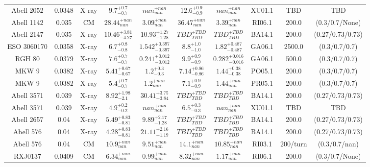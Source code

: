 \begin{table}
\begin{tabular}{cccccccccc}
Abell 2052 & 0.0348 & X-ray & ${9.7}^{+0.7}_{-0.7}$ & ${nan}^{+nan}_{nan}$ & ${12.6}^{+0.9}_{-0.9}$ & ${nan}^{+nan}_{nan}$ & XU01.1 & TBD & TBD \\
Abell 1142 & 0.035 & CM & ${28.44}^{+nan}_{nan}$ & ${3.09}^{+nan}_{nan}$ & ${36.47}^{+nan}_{nan}$ & ${3.39}^{+nan}_{nan}$ & RI06.1 & 200.0 & (0.3/0.7/None) \\
Abell 2147 & 0.035 & X-ray & ${10.46}^{+3.81}_{-4.27}$ & ${10.93}^{+1.27}_{-1.28}$ & ${TBD}^{+TBD}_{TBD}$ & ${TBD}^{+TBD}_{TBD}$ & BA14.1 & 200.0 & (0.27/0.73/0.73) \\
ESO 3060170 & 0.0358 & X-ray & ${6.7}^{+0.8}_{-0.8}$ & ${1.542}^{+0.397}_{-0.397}$ & ${8.8}^{+1.0}_{-1.0}$ & ${1.82}^{+0.487}_{-0.487}$ & GA06.1 & 2500.0 & (0.3/0.7/0.7) \\
RGH 80 & 0.0379 & X-ray & ${7.6}^{+0.7}_{-0.7}$ & ${0.241}^{+0.012}_{-0.012}$ & ${9.9}^{+0.9}_{-0.9}$ & ${0.282}^{+0.016}_{-0.016}$ & GA06.1 & 500.0 & (0.3/0.7/0.7) \\
MKW 9 & 0.0382 & X-ray & ${5.41}^{+0.67}_{-0.67}$ & ${1.2}^{+0.3}_{-0.3}$ & ${7.14}^{+0.86}_{-0.86}$ & ${1.44}^{+0.38}_{-0.38}$ & PO05.1 & 200.0 & (0.3/0.7/0.7) \\
MKW 9 & 0.0382 & X-ray & ${5.4}^{+0.7}_{-0.7}$ & ${1.2}^{+nan}_{nan}$ & ${7.1}^{+0.9}_{-0.9}$ & ${1.44}^{+nan}_{nan}$ & PR05.1 & 200.0 & (0.3/0.7/0.7) \\
Abell 3571 & 0.039 & X-ray & ${8.92}^{+1.98}_{-2.1}$ & ${30.41}^{+3.75}_{-3.84}$ & ${TBD}^{+TBD}_{TBD}$ & ${TBD}^{+TBD}_{TBD}$ & BA14.1 & 200.0 & (0.27/0.73/0.73) \\
Abell 3571 & 0.039 & X-ray & ${4.9}^{+0.2}_{-0.2}$ & ${nan}^{+nan}_{nan}$ & ${6.5}^{+0.3}_{-0.3}$ & ${nan}^{+nan}_{nan}$ & XU01.1 & TBD & TBD \\
Abell 2657 & 0.04 & X-ray & ${5.49}^{+0.83}_{-0.81}$ & ${9.89}^{+2.17}_{-1.28}$ & ${TBD}^{+TBD}_{TBD}$ & ${TBD}^{+TBD}_{TBD}$ & BA14.1 & 200.0 & (0.27/0.73/0.73) \\
Abell 576 & 0.04 & X-ray & ${4.28}^{+0.83}_{-0.81}$ & ${21.11}^{+2.16}_{-1.19}$ & ${TBD}^{+TBD}_{TBD}$ & ${TBD}^{+TBD}_{TBD}$ & BA14.1 & 200.0 & (0.27/0.73/0.73) \\
Abell 576 & 0.04 & CM & ${10.9}^{+nan}_{nan}$ & ${9.51}^{+nan}_{nan}$ & ${14.1}^{+nan}_{nan}$ & ${10.85}^{+nan}_{nan}$ & RI03.1 & 200/turn & (0.3/0.7/nan) \\
RXJ0137 & 0.0409 & CM & ${6.34}^{+nan}_{nan}$ & ${0.99}^{+nan}_{nan}$ & ${8.32}^{+nan}_{nan}$ & ${1.17}^{+nan}_{nan}$ & RI06.1 & 200.0 & (0.3/0.7/None) \\

\end{tabular}
\end{table}
